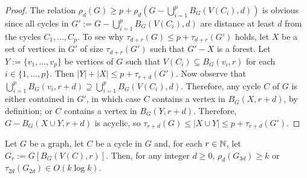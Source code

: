 \documentclass{patmorin}
\renewcommand{\ge}{\geqslant}
\renewcommand{\le}{\leqslant}
\begin{document}
\begin{proof}
  The relation $\rho_d(G)\ge p + \rho_d(G-\bigcup_{i=1}^p B_G(V(C_i),d))$ is obvious since all cycles in $G':=G-\bigcup_{i=1}^p B_G(V(C_i),d)$ are distance at least $d$ from the cycles $C_1,\ldots,C_p$.  To see why $\tau_{d+r}(G) \le p + \tau_{d+r}(G')$ holds, let $X$ be a set of vertices in $G'$ of size $\tau_{d+r}(G')$ such that $G'-X$ is a forest.  Let $Y:=\{v_1,\ldots,v_p\}$ be vertices of $G$ such that $V(C_i)\subseteq B_G(v_i,r)$ for each $i\in\{1,\ldots,p\}$.  Then $|Y|+|X|\le p + \tau_{r+d}(G')$.  Now observe that $\bigcup_{i=1}^p B_G(v_i,r+d)\supseteq \bigcup_{i=1}^p B_G(V(C_i),d)$.  Therefore, any cycle $C$ of $G$ is either contained in $G'$, in which case $C$ contains a vertex in $B_G(X,r+d)$, by definition; or $C$ contains a vertex in $B_{G}(Y,r+d)$.  Therefore, $G-B_G(X\cup Y,r+d)$ is acyclic, so $\tau_{r+d}(G)\le |X\cup Y| \le p + \tau_{r+d}(G')$.
\end{proof}

\begin{lem}
  Let $G$ be a graph, let $C$ be a cycle in $G$ and, for each $r\in\mathbb{N}$, let $G_r:=G[B_G(V(C),r)]$.  Then, for any integer $d\ge 0$, $\rho_d(G_{3d})\ge k$ or $\tau_{2d}(G_{2d})\in O(k\log k)$.
\end{lem}
\end{document}

